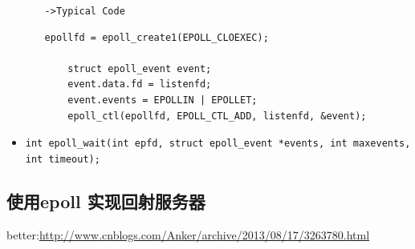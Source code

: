 \documentclass[UTF8,a4paper,12pt]{ctexbook}
\begin{document}
\begin{itemize}
\begin{enumerate}[itemindent = 1em]
							\verb|->Typical Code|
							\begin{lstlisting}[frame=L]
	epollfd = epoll_create1(EPOLL_CLOEXEC);
			
	struct epoll_event event;
	event.data.fd = listenfd;
	event.events = EPOLLIN | EPOLLET;
	epoll_ctl(epollfd, EPOLL_CTL_ADD, listenfd, &event);
							\end{lstlisting}
					\end{enumerate}
				\item \verb|int epoll_wait(int epfd, struct epoll_event *events, int maxevents, int timeout);|
			\end{itemize}
		\subsection{使用epoll 实现回射服务器}
			better:\url{http://www.cnblogs.com/Anker/archive/2013/08/17/3263780.html}
			
\end{document}
